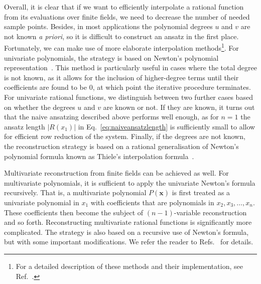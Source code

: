 \documentclass[main.tex]{subfiles}
\begin{document}
Overall, it is clear that if we want to efficiently interpolate a rational function from its evaluations over finite fields, we need to decrease the number of needed sample points. Besides, in most applications the polynomial degrees $u$ and $v$ are not known \textit{a priori}, so it is difficult to construct an ansatz in the first place. Fortunately, we can make use of more elaborate interpolation methods\footnote{For a detailed description of these methods and their implementation, see Ref.~\cite{Peraro:2016wsq}.}. For univariate polynomials, the strategy is based on Newton's polynomial representation~\cite{Abramowitz1965HandbookOM}. This method is particularly useful in cases where the total degree is not known, as it allows for the inclusion of higher-degree terms until their coefficients are found to be 0, at which point the iterative procedure terminates. For univariate rational functions, we distinguish between two further cases based on whether the degrees $u$ and $v$ are known or not. If they are known, it turns out that the naive ansatzing described above performs well enough, as for $n=1$ the ansatz length $|R(x_1)|$ in Eq.~\ref{eq:naiveansatzlength} is sufficiently small to allow for efficient row reduction of the system. Finally, if the degrees are not known, the reconstruction strategy is based on a rational generalisation of Newton's  polynomial formula known as Thiele's interpolation formula~\cite{Abramowitz1965HandbookOM}. 

Multivariate reconstruction from finite fields can be achieved as well. For multivariate polynomials, it is sufficient to apply the univariate Newton's formula recursively. That is, a multivariate polynomial $P(\mathbf{x})$ is first treated as a univariate polynomial in $x_1$ with coefficients that are polynomials in $x_2, x_3, \ldots, x_n$. These coefficients then become the subject of $(n-1)$-variable reconstruction and so forth. Reconstructing multivariate rational functions is significantly more complicated. The strategy is also based on a recursive use of Newton's formula, but with some important modifications. We refer the reader to Refs.~\cite{CUYT20111445, Peraro:2016wsq} for details.
\end{document}
